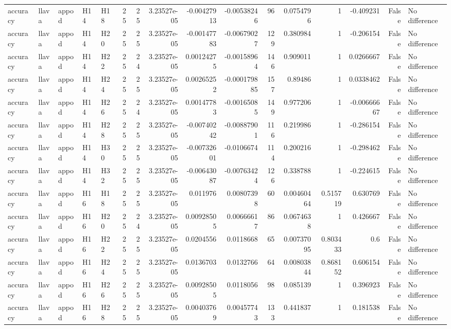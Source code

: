 \begin{longtable}{lllllrrrrrrrrrrl}
accuracy & llava & appod & H14 & H18 & 25 & 25 & 3.23527e-05 & -0.00427913 & -0.00538246 & 96 & 0.0754796 & 1 & -0.409231 & False & No difference \\
accuracy & llava & appod & H14 & H20 & 25 & 25 & 3.23527e-05 & -0.00147783 & -0.00679027 & 129 & 0.380984 & 1 & -0.206154 & False & No difference \\
accuracy & llava & appod & H14 & H22 & 25 & 24 & 3.23527e-05 & 0.00124275 & -0.00158964 & 146 & 0.909011 & 1 & 0.0266667 & False & No difference \\
accuracy & llava & appod & H14 & H24 & 25 & 25 & 3.23527e-05 & 0.00265252 & -0.000179885 & 157 & 0.89486 & 1 & 0.0338462 & False & No difference \\
accuracy & llava & appod & H14 & H26 & 25 & 24 & 3.23527e-05 & 0.00147783 & -0.00165085 & 149 & 0.977206 & 1 & -0.00666667 & False & No difference \\
accuracy & llava & appod & H14 & H28 & 25 & 25 & 3.23527e-05 & -0.00740242 & -0.00887901 & 116 & 0.219986 & 1 & -0.286154 & False & No difference \\
accuracy & llava & appod & H14 & H30 & 25 & 25 & 3.23527e-05 & -0.00732601 & -0.0106674 & 114 & 0.200216 & 1 & -0.298462 & False & No difference \\
accuracy & llava & appod & H14 & H32 & 25 & 25 & 3.23527e-05 & -0.00643087 & -0.00763424 & 126 & 0.338788 & 1 & -0.224615 & False & No difference \\
accuracy & llava & appod & H16 & H18 & 25 & 25 & 3.23527e-05 & 0.011976 & 0.00807398 & 60 & 0.00460464 & 0.515719 & 0.630769 & False & No difference \\
accuracy & llava & appod & H16 & H20 & 25 & 24 & 3.23527e-05 & 0.00928505 & 0.00666617 & 86 & 0.0674638 & 1 & 0.426667 & False & No difference \\
accuracy & llava & appod & H16 & H22 & 25 & 25 & 3.23527e-05 & 0.0204556 & 0.0118668 & 65 & 0.00737095 & 0.803433 & 0.6 & False & No difference \\
accuracy & llava & appod & H16 & H24 & 25 & 25 & 3.23527e-05 & 0.0136703 & 0.0132766 & 64 & 0.00803844 & 0.868152 & 0.606154 & False & No difference \\
accuracy & llava & appod & H16 & H26 & 25 & 25 & 3.23527e-05 & 0.00928505 & 0.0118056 & 98 & 0.085139 & 1 & 0.396923 & False & No difference \\
accuracy & llava & appod & H16 & H28 & 25 & 25 & 3.23527e-05 & 0.00403769 & 0.00457743 & 133 & 0.441837 & 1 & 0.181538 & False & No difference \\

\end{longtable}
